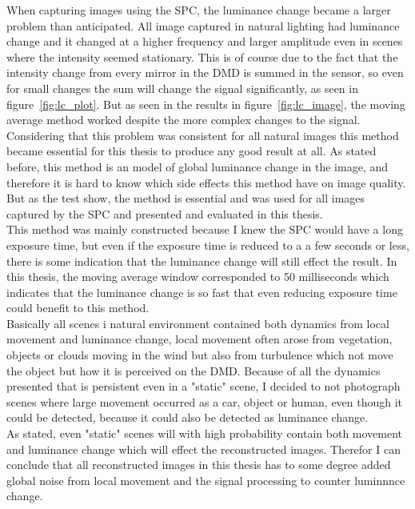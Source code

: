 When capturing images using the SPC, the luminance change became a larger problem than anticipated. All image captured in natural lighting had luminance change and it changed at a higher frequency and larger amplitude even in scenes where the intensity seemed stationary. This is of course due to the fact that the intensity change from every mirror in the DMD is summed in the sensor, so even for small changes the sum will change the signal significantly, as seen in figure~\ref{fig:lc_plot}. But as seen in the results in figure~\ref{fig:lc_image}, the moving average method worked despite the more complex changes to the signal. Considering that this problem was consistent for all natural images this method became essential for this thesis to produce any good result at all. As stated before, this method is an model of global luminance change in the image, and therefore it is hard to know which side effects this method have on image quality. But as the test show, the method is essential and was used for all images captured by the SPC and presented and evaluated in this thesis.\\[0.1in]

This method was mainly constructed because I knew the SPC would have a long exposure time, but even if the exposure time is reduced to a a few seconds or less, there is some indication that the luminance change will still effect the result. In this thesis, the moving average window corresponded to 50 milliseconds which indicates that the luminance change is so fast that even reducing exposure time could benefit to this method.\\[0.1in]


Basically all scenes i natural environment contained both dynamics from local movement and luminance change, local movement often arose from vegetation, objects or clouds moving in the wind but also from turbulence which not move the object but how it is perceived on the DMD. Because of all the dynamics presented that is persistent even in a "static" scene, I decided to not photograph scenes where large movement occurred as a car, object or human, even though it could be detected, because it could also be detected as luminance change.\\[0.1in]

As stated, even "static" scenes will with high probability contain both movement and luminance change which will effect the reconstructed images. Therefor I can conclude that all reconstructed images in this thesis has to some degree added global noise from local movement and the signal processing to counter luminnnce change.


